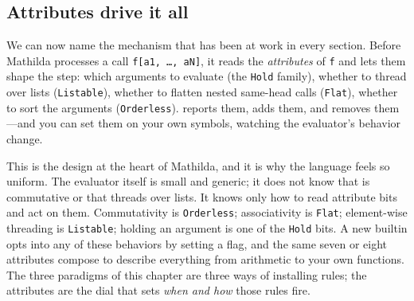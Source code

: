 \subsection{Attributes drive it all}
\label{sec:prog-attributes}

We can now name the mechanism that has been at work in every section. Before
Mathilda processes a call \texttt{f[a1, \ldots, aN]}, it reads the
\emph{attributes} of \texttt{f} and lets them shape the step: which arguments to
evaluate (the \texttt{Hold} family), whether to thread over lists
(\texttt{Listable}), whether to flatten nested same-head calls (\texttt{Flat}),
whether to sort the arguments (\texttt{Orderless}).  reports them,
 adds them, and  removes them---and you can set
them on your own symbols, watching the evaluator's behavior change.

\begin{codepairs}
\end{codepairs}

This is the design at the heart of Mathilda, and it is why the language feels so
uniform. The evaluator itself is small and generic; it does not know that
 is commutative or that  threads over lists. It knows only how to
read attribute bits and act on them. Commutativity is \texttt{Orderless};
associativity is \texttt{Flat}; element-wise threading is \texttt{Listable};
holding an argument is one of the \texttt{Hold} bits. A new builtin opts into any
of these behaviors by setting a flag, and the same seven or eight attributes
compose to describe everything from arithmetic to your own functions. The three
paradigms of this chapter are three ways of installing rules; the attributes are
the dial that sets \emph{when and how} those rules fire.

